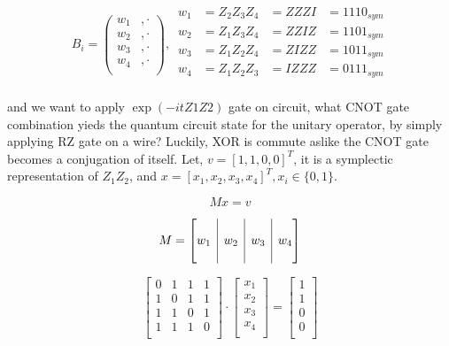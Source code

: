 \documentclass[a4paper,12pt]{article}
\newcommand{\rvline}{\hspace*{-\arraycolsep}\vline\hspace*{-\arraycolsep}}
\begin{document}
\begin{equation}
    B_i = \begin{pmatrix}
        w_1 &, \cdot \\
        w_2 &, \cdot \\
        w_3 &, \cdot \\
        w_4 &, \cdot \\
    \end{pmatrix},
    \,
    \begin{matrix}
        w_1 &= Z_2Z_3Z_4 &= ZZZI &= 1110_{sym}\\
        w_2 &= Z_1Z_3Z_4 &= ZZIZ &= 1101_{sym}\\
        w_3 &= Z_1Z_2Z_4 &= ZIZZ &= 1011_{sym}\\
        w_4 &= Z_1Z_2Z_3 &= IZZZ &= 0111_{sym}\\
    \end{matrix}
\end{equation}

and we want to apply $\exp(-i t Z1Z2)$ gate on circuit, what CNOT gate combination yieds
the quantum circuit state for the unitary operator, by simply applying RZ gate on a wire?
Luckily, XOR is commute aslike the CNOT gate becomes a conjugation of itself.
Let, $v =[1, 1, 0, 0]^T$, it is a symplectic representation of $Z_1Z_2$,
and $x = [x_1, x_2, x_3, x_4]^T, x_i \in \{0, 1\}$. 

\begin{equation}
    M x = v
\end{equation}

\begin{equation}
    M = \begin{bmatrix}
            & \rvline &     & \rvline &      & \rvline &  \\
        w_1 & \rvline &  w_2& \rvline &  w_3 & \rvline &  w_4\\
            & \rvline &     & \rvline &      & \rvline &  \\
    \end{bmatrix}
\end{equation}

\begin{equation} 
    \begin{bmatrix}
        0 & 1 & 1 & 1 \\
        1 & 0 & 1 & 1 \\
        1 & 1 & 0 & 1 \\
        1 & 1 & 1 & 0 \\
\end{bmatrix} \cdot \begin{bmatrix}
        x_1 \\
        x_2 \\
        x_3 \\
        x_4 \\
    \end{bmatrix} 
    = 
    \begin{bmatrix}
        1 \\
        1 \\
        0 \\
        0 \\
    \end{bmatrix}
\end{equation}
\end{document}
